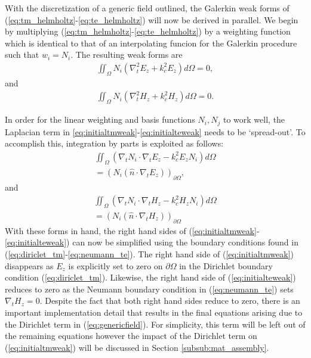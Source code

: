 With the discretization of a generic field outlined, the Galerkin weak forms of (\ref{eq:tm_helmholtz}-\ref{eq:te_helmholtz}) will now be derived in parallel. We begin by multiplying (\ref{eq:tm_helmholtz}-\ref{eq:te_helmholtz}) by a weighting function which is identical to that of an interpolating funcion for the Galerkin procedure such that $w_i=N_i$. The resulting weak forms are
\begin{align}
	\iint_\Omega N_i \left(\nabla_t^2 E_z+k_c^2E_z\right)d\Omega = 0,
	\label{eq:initialtmweak}
\end{align}
and
\begin{align}
	\iint_\Omega N_i \left(\nabla_t^2 H_z+k_c^2H_z\right)d\Omega = 0.
	\label{eq:initialteweak}
\end{align}

In order for the linear weighting and basis functions $N_i, N_j$ to work well, the Laplacian term in \ref{eq:initialtmweak}-\ref{eq:initialteweak} needs to be `spread-out'. To accomplish this, integration by parts is exploited as follows:
\begin{multline}
	\iint_\Omega\left(\nabla_tN_i\cdot\nabla_tE_z-k_c^2E_zN_i\right)d\Omega \\= \left(N_i(\hat{n}\cdot\nabla_tE_z)\right)_{\partial\Omega},
	\label{eq:initialtmweak}
\end{multline}
and
\begin{multline}
	\iint_\Omega\left(\nabla_tN_i\cdot\nabla_tH_z-k_c^2H_zN_i\right)d\Omega \\= \left(N_i(\hat{n}\cdot\nabla_tH_z)\right)_{\partial\Omega}
	\label{eq:initialteweak}
\end{multline}
With these forms in hand, the right hand sides of (\ref{eq:initialtmweak}-\ref{eq:initialteweak}) can now be simplified using the boundary conditions found in (\ref{eq:diriclet_tm}-\ref{eq:neumann_te}). The right hand side of (\ref{eq:initialtmweak}) disappears as $E_z$ is explicitly set to zero on $\partial\Omega$ in the Dirichlet boundary condition (\ref{eq:diriclet_tm}). Likewise, the right hand side of (\ref{eq:initialteweak}) reduces to zero as the Neumann boundary condition in (\ref{eq:neumann_te}) sets $\nabla_tH_z=0$. Despite the fact that both right hand sides reduce to zero, there is an important implementation detail that results in the final equations arising due to the Dirichlet term in (\ref{eq:genericfield}). For simplicity, this term will be left out of the remaining equations however the impact of the Dirichlet term on (\ref{eq:initialtmweak}) will be discussed in Section \ref{subsub:mat_assembly}.

